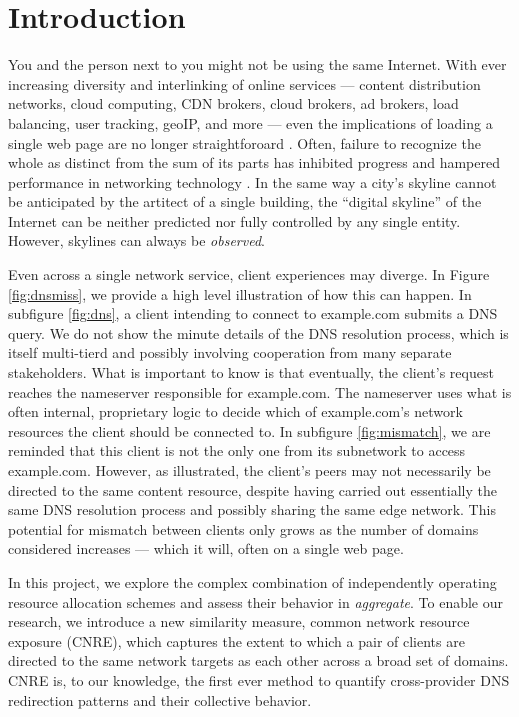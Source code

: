 \section{Introduction} \label{sect:intro}

You and the person next to you might not be using the same Internet. With
ever increasing diversity and interlinking of online services  --- content distribution networks, cloud computing, CDN brokers,
cloud brokers, ad brokers, load balancing, user tracking, geoIP, and more --- even the
implications
of loading a single web page are no longer straightforoard \cite{butkiewicz2011}. Often, failure to
recognize the whole as distinct from the sum of its parts has inhibited progress
and hampered performance in networking technology \cite{blair15iwarm,kakhki2017taking}. In the same way a city's
skyline cannot be anticipated by the artitect of a single  building, the
``digital skyline'' of the Internet can be neither predicted nor fully
controlled by any single entity.
However, skylines can always be \emph{observed}.

Even across a single network service, client experiences may diverge. In Figure
\ref{fig:dnsmiss}, we provide a high level illustration of how this can happen.
In subfigure \ref{fig:dns},  a client intending to connect to example.com submits a DNS query. We do not
show the minute details of
the DNS resolution process, which is itself multi-tierd and possibly involving
cooperation from many separate stakeholders. What is important to know is that
eventually, the client's request reaches the nameserver responsible for
example.com. The nameserver uses what is often internal, proprietary
logic to decide which of example.com's network resources the client should be
connected to. In subfigure \ref{fig:mismatch}, we are reminded that this client
is not the only one from its subnetwork to access example.com. However, as illustrated,
the client's peers may not necessarily be directed to the same content resource, despite
having carried out essentially the same DNS resolution process and possibly
sharing the same edge network. This potential for mismatch between clients only
grows as the number of domains considered increases --- which it will, often on
a single web page.

In this project, we explore the complex combination of independently operating
resource allocation schemes and assess their behavior in \emph{aggregate}. To
enable our research, we introduce a new similarity measure, common network
resource exposure (CNRE), which captures the extent to which a pair of clients
are directed to the same network targets as each other across a broad set of
domains. CNRE is, to our knowledge, the first ever method to quantify
cross-provider DNS redirection patterns and their collective behavior. 

